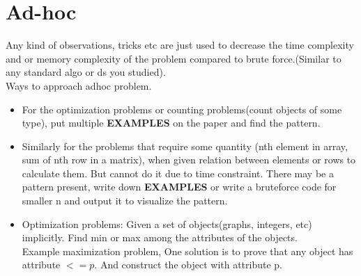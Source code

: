 \documentclass[../Notes.tex]{subfiles}
\begin{document}
\chapter{Ad-hoc}
Any kind of observations, tricks etc are just used to decrease the time complexity and or memory complexity of the problem compared to brute force.(Similar to any standard  algo or ds you studied).\\

Ways to approach adhoc problem.
\begin{itemize}
	\item For the optimization problems or counting problems(count objects of some type), put multiple \textbf{EXAMPLES} on the paper and find the pattern.
	\item Similarly for the problems that require some quantity (nth element in array, sum of nth row in a matrix), when given relation between elements or rows to calculate them. But cannot do it due to time constraint. There may be a pattern present, write down \textbf{EXAMPLES} or write a bruteforce code for smaller n and output it to visualize the pattern.
	\item Optimization problems: Given a set of objects(graphs, integers, etc) implicitly. Find min or max among the attributes of the objects.\\ Example maximization problem, One solution is to prove that any object has attribute $<= p$. And construct the object with attribute p.  
\end{itemize}
\end{document}
